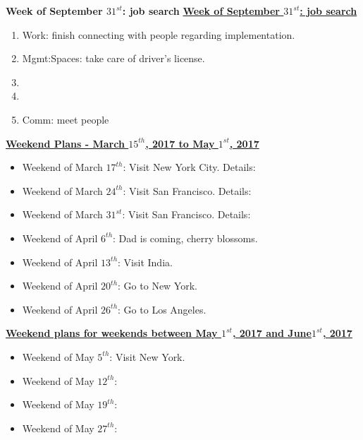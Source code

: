 \begin{columns}
\begin{column}{0.333\columnwidth}
\begin{columns}
\begin{column}{0.5\linewidth}
\ifdefined\POSTER
\begin{block}{\small \bf Week of September $31^{st}$: job search}
\else
\underline{\bf Week of September $31^{st}$: job search}\\
\fi

\begin{enumerate}
\tiny \item \tiny Work: finish connecting with people regarding
implementation. 
\item \tiny Mgmt:Spaces: take care of driver's license. 
\item \tiny 
\item \tiny 
\item \tiny Comm: meet people 
\end{enumerate}

\ifdefined\POSTER
\end{block}
\fi

\ifdefined\POSTER
\begin{block}
\fi

{\underline{\bf Weekend Plans - March $15^{th}$, 2017 to May $1^{st}$,
2017}}\\

\begin{itemize}
\item \tiny Weekend of March $17^{th}$: Visit New York City. Details:
\item \tiny Weekend of March $24^{th}$: Visit San Francisco. Details:
\item \tiny Weekend of March $31^{st}$: Visit San Francisco. Details:
\item \tiny Weekend of April $6^{th}$:  Dad is coming, cherry
  blossoms.
\item \tiny Weekend of April $13^{th}$: Visit India.
\item \tiny Weekend of April $20^{th}$: Go to New York.
\item \tiny Weekend of April $26^{th}$: Go to Los Angeles.
\end{itemize}

{\underline{\bf  Weekend plans for weekends between May $1^{st}$, 2017
    and June$1^{st}$, 2017}}\\
\begin{itemize}
\item \tiny Weekend of May $5^{th}$: Visit New York.
\item \tiny Weekend of May $12^{th}$:
\item \tiny Weekend of May $19^{th}$:
\item \tiny Weekend of May $27^{th}$:
\end{itemize}



\end{block}
\end{column}
\end{columns}
\end{column}
\end{columns}
